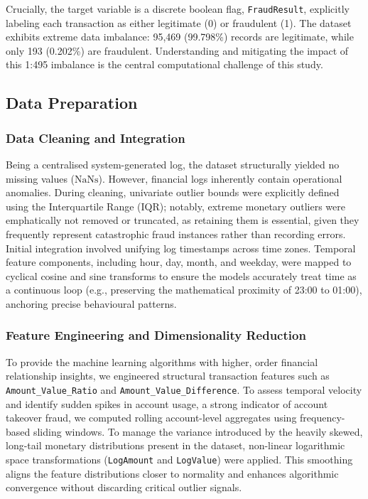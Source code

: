 \documentclass[a4paper,fleqn]{cas-sc}
\begin{document}
Crucially, the target variable is a discrete boolean flag, \texttt{FraudResult}, explicitly labeling each transaction as either legitimate (0) or fraudulent (1). The dataset exhibits extreme data imbalance: 95,469 (99.798\%) records are legitimate, while only 193 (0.202\%) are fraudulent. Understanding and mitigating the impact of this 1:495 imbalance is the central computational challenge of this study.

\subsection{Data Preparation}

\subsubsection{Data Cleaning and Integration}
Being a centralised system-generated log, the dataset structurally yielded no missing values ($\text{NaNs}$). However, financial logs inherently contain operational anomalies. During cleaning, univariate outlier bounds were explicitly defined using the Interquartile Range (IQR); notably, extreme monetary outliers were emphatically not removed or truncated, as retaining them is essential, given they frequently represent catastrophic fraud instances rather than recording errors. Initial integration involved unifying log timestamps across time zones. Temporal feature components, including hour, day, month, and weekday, were mapped to cyclical cosine and sine transforms to ensure the models accurately treat time as a continuous loop (e.g., preserving the mathematical proximity of 23:00 to 01:00), anchoring precise behavioural patterns.

\subsubsection{Feature Engineering and Dimensionality Reduction}
To provide the machine learning algorithms with higher, order financial relationship insights, we engineered structural transaction features such as \texttt{Amount\_Value\_Ratio} and \texttt{Amount\_Value\_Difference}. To assess temporal velocity and identify sudden spikes in account usage, a strong indicator of account takeover fraud, we computed rolling account-level aggregates using frequency-based sliding windows. To manage the variance introduced by the heavily skewed, long-tail monetary distributions present in the dataset, non-linear logarithmic space transformations (\texttt{LogAmount} and \texttt{LogValue}) were applied. This smoothing aligns the feature distributions closer to normality and enhances algorithmic convergence without discarding critical outlier signals. 
\end{document}

